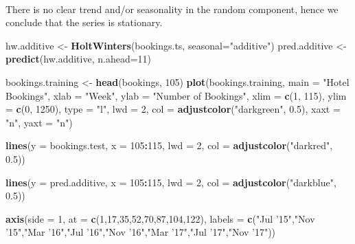 \documentclass[]{article}
\newenvironment{Shaded}{\begin{snugshade}}{\end{snugshade}}
\newcommand{\DataTypeTok}[1]{\textcolor[rgb]{0.13,0.29,0.53}{#1}}
\newcommand{\DecValTok}[1]{\textcolor[rgb]{0.00,0.00,0.81}{#1}}
\newcommand{\FloatTok}[1]{\textcolor[rgb]{0.00,0.00,0.81}{#1}}
\newcommand{\KeywordTok}[1]{\textcolor[rgb]{0.13,0.29,0.53}{\textbf{#1}}}
\newcommand{\NormalTok}[1]{#1}
\newcommand{\OperatorTok}[1]{\textcolor[rgb]{0.81,0.36,0.00}{\textbf{#1}}}
\newcommand{\StringTok}[1]{\textcolor[rgb]{0.31,0.60,0.02}{#1}}
\begin{document}
\(\;\)

There is no clear trend and/or seasonality in the random component,
hence we conclude that the series is stationary.

\newpage

\begin{Shaded}
\begin{Highlighting}[]
\NormalTok{hw.additive <-}\StringTok{ }\KeywordTok{HoltWinters}\NormalTok{(bookings.ts, }\DataTypeTok{seasonal=}\StringTok{"additive"}\NormalTok{)}
\NormalTok{pred.additive <-}\StringTok{ }\KeywordTok{predict}\NormalTok{(hw.additive, }\DataTypeTok{n.ahead=}\DecValTok{11}\NormalTok{)}

\NormalTok{bookings.training <-}\StringTok{ }\KeywordTok{head}\NormalTok{(bookings, }\DecValTok{105}\NormalTok{)}
\KeywordTok{plot}\NormalTok{(bookings.training,}
     \DataTypeTok{main =} \StringTok{"Hotel Bookings"}\NormalTok{,}
     \DataTypeTok{xlab =} \StringTok{"Week"}\NormalTok{,}
     \DataTypeTok{ylab =} \StringTok{"Number of Bookings"}\NormalTok{,}
     \DataTypeTok{xlim =} \KeywordTok{c}\NormalTok{(}\DecValTok{1}\NormalTok{, }\DecValTok{115}\NormalTok{),}
     \DataTypeTok{ylim =} \KeywordTok{c}\NormalTok{(}\DecValTok{0}\NormalTok{, }\DecValTok{1250}\NormalTok{),}
     \DataTypeTok{type =} \StringTok{"l"}\NormalTok{,}
     \DataTypeTok{lwd =} \DecValTok{2}\NormalTok{,}
     \DataTypeTok{col =} \KeywordTok{adjustcolor}\NormalTok{(}\StringTok{"darkgreen"}\NormalTok{, }\FloatTok{0.5}\NormalTok{),}
     \DataTypeTok{xaxt =} \StringTok{"n"}\NormalTok{,}
     \DataTypeTok{yaxt =} \StringTok{"n"}\NormalTok{)}

\KeywordTok{lines}\NormalTok{(}\DataTypeTok{y =}\NormalTok{ bookings.test,}
      \DataTypeTok{x =} \DecValTok{105}\OperatorTok{:}\DecValTok{115}\NormalTok{,}
      \DataTypeTok{lwd =} \DecValTok{2}\NormalTok{,}
      \DataTypeTok{col =} \KeywordTok{adjustcolor}\NormalTok{(}\StringTok{"darkred"}\NormalTok{, }\FloatTok{0.5}\NormalTok{))}

\KeywordTok{lines}\NormalTok{(}\DataTypeTok{y =}\NormalTok{ pred.additive,}
      \DataTypeTok{x =} \DecValTok{105}\OperatorTok{:}\DecValTok{115}\NormalTok{,}
      \DataTypeTok{lwd =} \DecValTok{2}\NormalTok{,}
      \DataTypeTok{col =} \KeywordTok{adjustcolor}\NormalTok{(}\StringTok{"darkblue"}\NormalTok{, }\FloatTok{0.5}\NormalTok{))}

\KeywordTok{axis}\NormalTok{(}\DataTypeTok{side =} \DecValTok{1}\NormalTok{, }\DataTypeTok{at =} \KeywordTok{c}\NormalTok{(}\DecValTok{1}\NormalTok{,}\DecValTok{17}\NormalTok{,}\DecValTok{35}\NormalTok{,}\DecValTok{52}\NormalTok{,}\DecValTok{70}\NormalTok{,}\DecValTok{87}\NormalTok{,}\DecValTok{104}\NormalTok{,}\DecValTok{122}\NormalTok{),}
     \DataTypeTok{labels =} \KeywordTok{c}\NormalTok{(}\StringTok{"Jul '15"}\NormalTok{,}\StringTok{"Nov '15"}\NormalTok{,}\StringTok{"Mar '16"}\NormalTok{,}\StringTok{"Jul '16"}\NormalTok{,}\StringTok{"Nov '16"}\NormalTok{,}\StringTok{"Mar '17"}\NormalTok{,}\StringTok{"Jul '17"}\NormalTok{,}\StringTok{"Nov '17"}\NormalTok{))}


\end{Highlighting}
\end{Shaded}
\end{document}
